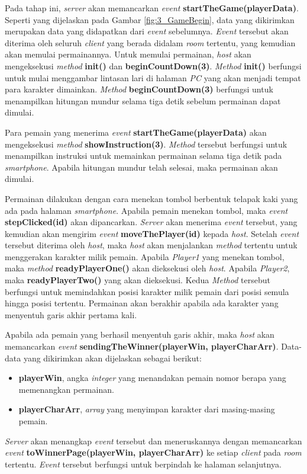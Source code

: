 Pada tahap ini, \textit{server} akan memancarkan \textit{event} \textbf{startTheGame(playerData)}. Seperti yang dijelaskan pada Gambar \ref{fig:3_GameBegin}, data yang dikirimkan merupakan data yang didapatkan dari \textit{event} sebelumnya. \textit{Event} tersebut akan diterima oleh seluruh \textit{client} yang berada didalam \textit{room} tertentu, yang kemudian akan memulai permainannya. Untuk memulai permainan, \textit{host} akan mengeksekusi \textit{method} \textbf{init()} dan \textbf{beginCountDown(3)}. \textit{Method} \textbf{init()} berfungsi untuk mulai menggambar lintasan lari di halaman \textit{PC} yang akan menjadi tempat para karakter dimainkan. \textit{Method} \textbf{beginCountDown(3)} berfungsi untuk menampilkan hitungan mundur selama tiga detik sebelum permainan dapat dimulai. 

Para pemain yang menerima \textit{event} \textbf{startTheGame(playerData)} akan mengeksekusi \textit{method} \textbf{showInstruction(3)}. \textit{Method} tersebut berfungsi untuk menampilkan instruksi untuk memainkan permainan selama tiga detik pada \textit{smartphone}. Apabila hitungan mundur telah selesai, maka permainan akan dimulai.

Permainan dilakukan dengan cara menekan tombol berbentuk telapak kaki yang ada pada halaman \textit{smartphone}. Apabila pemain menekan tombol, maka \textit{event} \textbf{stepClicked(id)} akan dipancarkan. \textit{Server} akan menerima \textit{event} tersebut, yang kemudian akan mengirim \textit{event} \textbf{moveThePlayer(id)} kepada \textit{host}. Setelah \textit{event} tersebut diterima oleh \textit{host}, maka \textit{host} akan menjalankan \textit{method} tertentu untuk menggerakan karakter milik pemain. Apabila \textit{Player1} yang menekan tombol, maka \textit{method} \textbf{readyPlayerOne()} akan dieksekusi oleh \textit{host}. Apabila \textit{Player2}, maka \textbf{readyPlayerTwo()} yang akan dieksekusi. Kedua \textit{Method} tersebut berfungsi untuk memindahkan posisi karakter milik pemain dari posisi semula hingga posisi tertentu. Permainan akan berakhir apabila ada karakter yang menyentuh garis akhir pertama kali.

Apabila ada pemain yang berhasil menyentuh garis akhir, maka \textit{host} akan memancarkan \textit{event} \textbf{sendingTheWinner(playerWin, playerCharArr)}. Data-data yang dikirimkan akan dijelaskan sebagai berikut:
\begin{itemize}
	\item \textbf{playerWin}, angka \textit{integer} yang menandakan pemain nomor berapa yang memenangkan permainan.
	\item \textbf{playerCharArr}, \textit{array} yang menyimpan karakter dari masing-masing pemain.
\end{itemize}
\textit{Server} akan menangkap \textit{event} tersebut dan meneruskannya dengan memancarkan \textit{event} \textbf{toWinnerPage(playerWin, playerCharArr)} ke setiap \textit{client} pada \textit{room} tertentu. \textit{Event} tersebut berfungsi untuk berpindah ke halaman selanjutnya.

